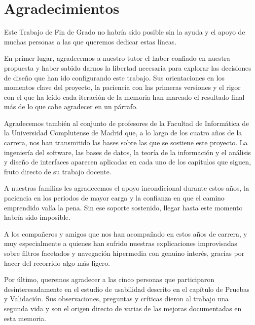 
\chapter*{Agradecimientos}

Este Trabajo de Fin de Grado no habría sido posible sin la ayuda y el apoyo de muchas personas
a las que queremos dedicar estas líneas.

En primer lugar, agradecemos a nuestro tutor el haber confiado en nuestra propuesta y haber
sabido darnos la libertad necesaria para explorar las decisiones de diseño que han ido
configurando este trabajo. Sus orientaciones en los momentos clave del proyecto, la paciencia
con las primeras versiones y el rigor con el que ha leído cada iteración de la memoria han
marcado el resultado final más de lo que cabe agradecer en un párrafo.

Agradecemos también al conjunto de profesores de la Facultad de Informática de la Universidad
Complutense de Madrid que, a lo largo de los cuatro años de la carrera, nos han transmitido
las bases sobre las que se sostiene este proyecto. La ingeniería del software, las bases de
datos, la teoría de la información y el análisis y diseño de interfaces aparecen aplicadas en
cada uno de los capítulos que siguen, fruto directo de su trabajo docente.

A nuestras familias les agradecemos el apoyo incondicional durante estos años, la paciencia en
los periodos de mayor carga y la confianza en que el camino emprendido valía la pena. Sin ese
soporte sostenido, llegar hasta este momento habría sido imposible.

A los compañeros y amigos que nos han acompañado en estos años de carrera, y muy especialmente
a quienes han sufrido nuestras explicaciones improvisadas sobre filtros facetados y navegación
hipermedia con genuino interés, gracias por hacer del recorrido algo más ligero.

Por último, queremos agradecer a las cinco personas que participaron desinteresadamente en el
estudio de usabilidad descrito en el capítulo de Pruebas y Validación. Sus observaciones,
preguntas y críticas dieron al trabajo una segunda vida y son el origen directo de varias de
las mejoras documentadas en esta memoria.
